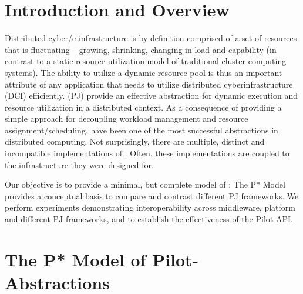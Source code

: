 \documentclass{sig-alt-release2}
\begin{document}



\upp
\section{Introduction and Overview} 

Distributed cyber/e-infrastructure is by definition comprised of a set
of resources that is fluctuating -- growing, shrinking, changing in
load and capability (in contrast to a static resource utilization
model of traditional cluster computing systems).  The
ability to utilize a dynamic resource pool is thus an important
attribute of any application that needs to utilize distributed
cyberinfrastructure (DCI) efficiently. \pilotjobs (PJ) provide an
effective abstraction for dynamic execution and resource utilization
in a distributed context. As a consequence of providing a simple
approach for decoupling workload management and resource
assignment/scheduling, \pilotjobs have been one of the most successful
abstractions in distributed computing.  Not surprisingly, there are
multiple, distinct and incompatible implementations of
\pilotjobs. Often, these implementations are coupled to the
infrastructure they were designed for.

Our objective is to provide a minimal, but complete model of
\pilotjobs: The P* Model provides a conceptual basis to compare and
contrast different PJ frameworks.  We perform experiments
demonstrating interoperability across middleware, platform and
different PJ frameworks, and to establish the effectiveness of the
Pilot-API.


\section{The P* Model of Pilot-\\Abstractions}
\label{sec:pilot-model}
\end{document}
